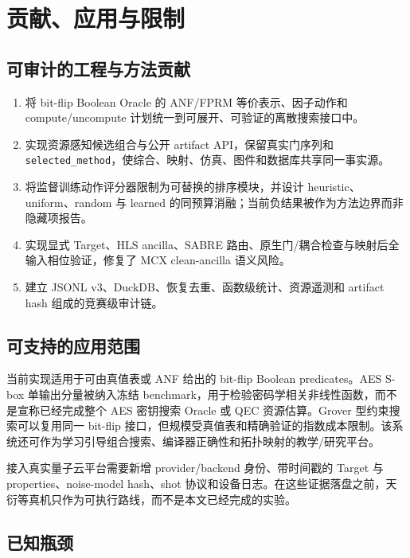 \documentclass[UTF8,a4paper,12pt]{ctexart}
\begin{document}
\section{贡献、应用与限制}

\subsection{可审计的工程与方法贡献}

\begin{enumerate}
  \item 将 bit-flip Boolean Oracle 的 ANF/FPRM 等价表示、因子动作和 compute/uncompute 计划统一到可展开、可验证的离散搜索接口中。
  \item 实现资源感知候选组合与公开 artifact API，保留真实门序列和 \texttt{selected\_method}，使综合、映射、仿真、图件和数据库共享同一事实源。
  \item 将监督训练动作评分器限制为可替换的排序模块，并设计 heuristic、uniform、random 与 learned 的同预算消融；当前负结果被作为方法边界而非隐藏项报告。
  \item 实现显式 Target、HLS ancilla、SABRE 路由、原生门/耦合检查与映射后全输入相位验证，修复了 MCX clean-ancilla 语义风险。
  \item 建立 JSONL v3、DuckDB、恢复去重、函数级统计、资源遥测和 artifact hash 组成的竞赛级审计链。
\end{enumerate}

\subsection{可支持的应用范围}

当前实现适用于可由真值表或 ANF 给出的 bit-flip Boolean predicates。AES S-box 单输出分量被纳入冻结 benchmark，用于检验密码学相关非线性函数，而不是宣称已经完成整个 AES 密钥搜索 Oracle 或 QEC 资源估算。Grover 型约束搜索可以复用同一 bit-flip 接口，但规模受真值表和精确验证的指数成本限制。该系统还可作为学习引导组合搜索、编译器正确性和拓扑映射的教学/研究平台。

接入真实量子云平台需要新增 provider/backend 身份、带时间戳的 Target 与 properties、noise-model hash、shot 协议和设备日志。在这些证据落盘之前，天衍等真机只作为可执行路线，而不是本文已经完成的实验。

\subsection{已知瓶颈}
\end{document}
